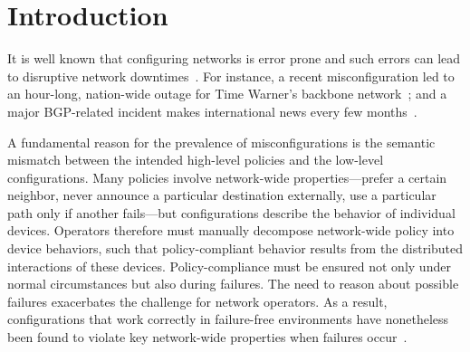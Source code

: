 \documentclass{sig-alternate-10pt}
\newcommand{\dpw}[1]{\textcolor{tmlblue}{[dpw: #1]}}
\begin{document}
%
%
%
%


\section{Introduction}
\label{sec:introduction}

It is well known that configuring networks is error
prone and such errors can lead to disruptive network
downtimes~\cite{mahajan+:bgp-misconfiguration,feamster+:rcc,batfish,dc-failure-study}.
For instance, a recent misconfiguration led to an hour-long, nation-wide outage for Time Warner's backbone network~\cite{time-warner}; and a major BGP-related incident makes international news every few months~\cite{bgpmon}.



A fundamental reason for the prevalence of misconfigurations is the
semantic mismatch between the intended high-level
policies and the low-level configurations.
Many policies involve network-wide properties---prefer a certain neighbor,
never announce a particular destination externally,
use a particular path only if another fails---but configurations describe the behavior of
individual devices.
%
Operators therefore must manually decompose network-wide policy into
device behaviors, such that policy-compliant behavior results from the distributed interactions of
these devices.
%
Policy-compliance must be ensured not only under normal
circumstances but also during failures.  The need to reason
about possible failures exacerbates the challenge
for network operators.  As a result, configurations that work
correctly in failure-free environments have nonetheless been found to violate key
network-wide properties when failures occur~\cite{batfish}.
\end{document}
